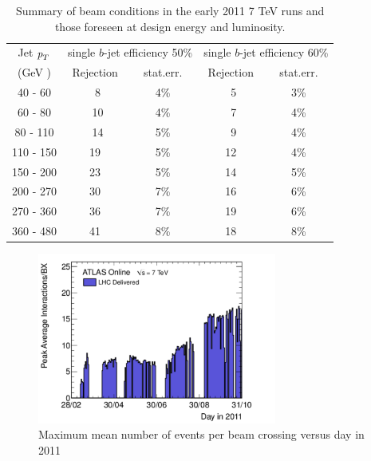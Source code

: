 \begin{table}[!hbt] %
\renewcommand{\arraystretch}{1.2}
\centering
\begin{tabular}{ | c || c | c || c | c||}
  \hline
  Jet ${\emph{p}_{T}}$ & \multicolumn{2}{c||}{single $b$-jet efficiency 50\%} & 
            \multicolumn{2}{c||}{single $b$-jet efficiency 60\%}\\ \cline{2-5}
    (GeV )  & Rejection & ~stat.err.~ & Rejection & ~stat.err.~ \\ \hline
   40 - 60 &  ~8 &  4\%  &  ~5  &  3\%    \\ 
   60 - 80 &  ~10 &  4\%  &  ~7  &  4\%    \\ 
   80 - 110&  ~14 &  5\%  &  ~9  &  4\%    \\ 
  110 - 150&  19 &  5\%  &  12  &  4\%    \\ 
  150 - 200&  23 &  5\%  &  14  &  5\%    \\ 
  200 - 270&  30 &  7\%  &  16  &  6\%    \\ 
  270 - 360&  36 &  7\%  &  19  &  6\%    \\ 
  360 - 480&  41 &  8\%  &  18  &  8\%    \\ \hline
\end{tabular}
\caption{Summary of beam conditions in the early 2011 7 TeV runs and those foreseen at design energy and luminosity.}
\label{tb:beamparameters}
\end{table}

\begin{figure}[htbp]
  \begin{center}
      \includegraphics[width=0.7\textwidth]{Fig2/peakAvgMuByDay.pdf}
    \caption{Maximum mean number of events per beam crossing versus day in 2011}
    \label{fig:peakAvgMu}
  \end{center}
\end{figure}




